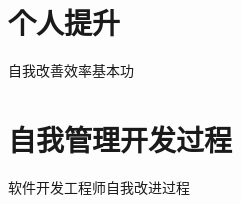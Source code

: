 \documentclass{book}        %
\begin{document}

\tableofcontents %

















\part{个人提升}自我改善效率基本功\\




\part{自我管理开发过程}软件开发工程师自我改进过程\\

\end{document}
